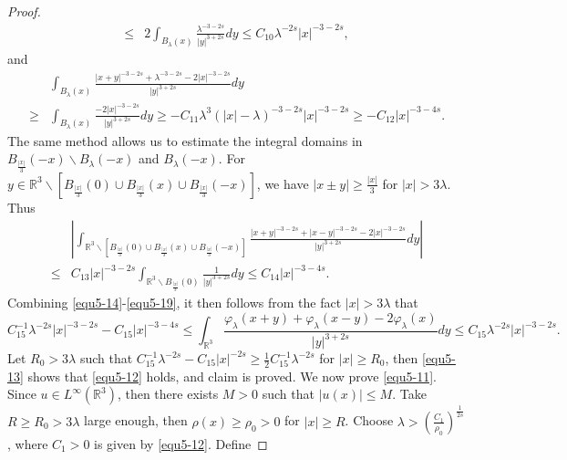 \documentclass[reqno, 11pt]{amsart} %
\numberwithin{equation}{section}
\begin{document}
\begin{proof}
\begin{equation}
\begin{split}
				\leq&2\int_{ B_{\lambda}(x)}\frac{\lambda^{-3-2s}}{|y|^{3+2s}}dy\leq C_{10}\lambda^{-2s}|x|^{-3-2s},
			\end{split}
		\end{equation}
		and
		\begin{equation}\label{equ5-18}
			\begin{split}
				&\int_{ B_{\lambda}(x)}\frac{|x+y|^{-3-2s}+\lambda^{-3-2s}-2|x|^{-3-2s}}{|y|^{3+2s}}dy\\
				\geq&\int_{ B_{\lambda}(x)}\frac{-2|x|^{-3-2s}}{|y|^{3+2s}}dy\geq-C_{11}\lambda^{3}(|x|-\lambda)^{-3-2s}|x|^{-3-2s}\geq-C_{12}|x|^{-3-4s}.
			\end{split}
		\end{equation}
		The same method allows us to estimate the integral domains in $B_{\frac{|x|}{3}}(-x)\backslash B_{\lambda}(-x)$ and $B_{\lambda}(-x)$. For $y\in \mathbb{R}^{3}\backslash \left[B_{\frac{|x|}{3}}(0)\cup B_{\frac{|x|}{3}}(x)\cup B_{\frac{|x|}{3}}(-x)\right]$, we have $|x\pm y|\geq\frac{|x|}{3}$ for $|x|>3\lambda$. Thus
		\begin{equation}\label{equ5-19}
			\begin{split}
				&\left|\int_{\mathbb{R}^{3}\backslash \left[B_{\frac{|x|}{3}}(0)\cup B_{\frac{|x|}{3}}(x)\cup B_{\frac{|x|}{3}}(-x)\right]}\frac{|x+y|^{-3-2s}+|x-y|^{-3-2s}-2|x|^{-3-2s}}{|y|^{3+2s}}dy\right|\\
				\leq&C_{13}|x|^{-3-2s}\int_{\mathbb{R}^{3}\backslash B_{\frac{|x|}{3}}(0)}\frac{1}{|y|^{3+2s}}dy\leq C_{14}|x|^{-3-4s}.
			\end{split}
		\end{equation}
		Combining \eqref{equ5-14}-\eqref{equ5-19}, it then follows from the fact $|x|>3\lambda$ that
		\begin{equation*}
			C_{15}^{-1}\lambda^{-2s}|x|^{-3-2s}-C_{15}|x|^{-3-4s}\leq\int_{\mathbb{R}^{3}}\frac{\varphi_{\lambda}(x+y)+\varphi_{\lambda}(x-y)-2\varphi_{\lambda}(x)}{|y|^{3+2s}}dy\leq C_{15}\lambda^{-2s}|x|^{-3-2s}.
		\end{equation*}
		Let $R_{0}>3\lambda$ such that $C_{15}^{-1}\lambda^{-2s}-C_{15}|x|^{-2s}\geq\frac{1}{2}C_{15}^{-1}\lambda^{-2s}$ for $|x|\geq R_{0}$, then \eqref{equ5-13} shows that \eqref{equ5-12} holds, and claim is proved. We now prove \eqref{equ5-11}. Since $u\in L^{\infty}(\mathbb{R}^{3})$, then there exists $M>0$ such that $|u(x)|\leq M$. Take $R\geq R_{0}>3\lambda$ large enough, then $\rho(x)\geq\rho_{0}>0$ for $|x|\geq R$. Choose $\lambda>\left( \frac{C_{1}}{\rho_{0}}\right)^{\frac{1}{2s}}$, where $C_{1}>0$ is given by \eqref{equ5-12}. Define 

\end{proof}
\end{document}
